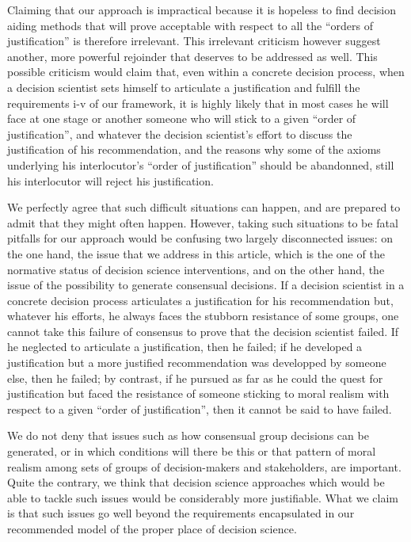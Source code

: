 \documentclass[preprint, french, english, 11pt, authoryear]{elsarticle}%
\begin{document}
Claiming that our approach is impractical because it is hopeless to find decision aiding methods that will prove acceptable with respect to all the ``orders of justification'' is therefore irrelevant. This irrelevant criticism however suggest another, more powerful rejoinder that deserves to be addressed as well. This possible criticism would claim that, even within a concrete decision process, when a decision scientist sets himself to articulate a justification and fulfill the requirements i-v of our framework, it is highly likely that in most cases he will face at one stage or another someone who will stick to a given ``order of justification'', and whatever the decision scientist's effort to discuss the justification of his recommendation, and the reasons why some of the axioms underlying his interlocutor's ``order of justification'' should be abandonned, still his interlocutor will reject his justification.

We perfectly agree that such difficult situations can happen, and are prepared to admit that they might often happen. However, taking such situations to be fatal pitfalls for our approach would be confusing two largely disconnected issues: on the one hand, the issue that we address in this article, which is the one of the normative status of decision science interventions, and on the other hand, the issue of the possibility to generate consensual decisions. If a decision scientist in a concrete decision process articulates a justification for his recommendation but, whatever his efforts, he always faces the stubborn resistance of some groups, one cannot take this failure of consensus to prove that the decision scientist failed. If he neglected to articulate a justification, then he failed; if he developed a justification but a more justified recommendation was developped by someone else, then he failed; by contrast, if he pursued as far as he could the quest for justification but faced the resistance of someone sticking to moral realism with respect to a given ``order of justification'', then it cannot be said to have failed.

We do not deny that issues such as how consensual group decisions can be generated, or in which conditions will there be this or that pattern of moral realism among sets of groups of decision-makers and stakeholders, are important. Quite the contrary, we think that decision science approaches which would be able to tackle such issues would be considerably more justifiable. What we claim is that such issues go well beyond the requirements encapsulated in our recommended model of the proper place of decision science.
\end{document}
